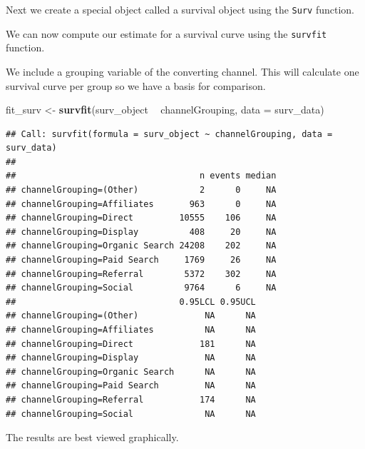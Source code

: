 \documentclass[]{book}
\newenvironment{Shaded}{\begin{snugshade}}{\end{snugshade}}
\newcommand{\KeywordTok}[1]{\textcolor[rgb]{0.13,0.29,0.53}{\textbf{#1}}}
\newcommand{\DataTypeTok}[1]{\textcolor[rgb]{0.13,0.29,0.53}{#1}}
\newcommand{\StringTok}[1]{\textcolor[rgb]{0.31,0.60,0.02}{#1}}
\newcommand{\OperatorTok}[1]{\textcolor[rgb]{0.81,0.36,0.00}{\textbf{#1}}}
\newcommand{\NormalTok}[1]{#1}
\begin{document}
Next we create a special object called a survival object using the
\texttt{Surv} function.

\begin{Shaded}
\end{Shaded}

We can now compute our estimate for a survival curve using the
\texttt{survfit} function.

We include a grouping variable of the converting channel. This will
calculate one survival curve per group so we have a basis for
comparison.

\begin{Shaded}
\begin{Highlighting}[]
\NormalTok{fit_surv <-}\StringTok{ }\KeywordTok{survfit}\NormalTok{(surv_object }\OperatorTok{~}\StringTok{ }\NormalTok{channelGrouping, }\DataTypeTok{data =}\NormalTok{ surv_data)}
\end{Highlighting}
\end{Shaded}

\begin{verbatim}
## Call: survfit(formula = surv_object ~ channelGrouping, data = surv_data)
## 
##                                    n events median
## channelGrouping=(Other)            2      0     NA
## channelGrouping=Affiliates       963      0     NA
## channelGrouping=Direct         10555    106     NA
## channelGrouping=Display          408     20     NA
## channelGrouping=Organic Search 24208    202     NA
## channelGrouping=Paid Search     1769     26     NA
## channelGrouping=Referral        5372    302     NA
## channelGrouping=Social          9764      6     NA
##                                0.95LCL 0.95UCL
## channelGrouping=(Other)             NA      NA
## channelGrouping=Affiliates          NA      NA
## channelGrouping=Direct             181      NA
## channelGrouping=Display             NA      NA
## channelGrouping=Organic Search      NA      NA
## channelGrouping=Paid Search         NA      NA
## channelGrouping=Referral           174      NA
## channelGrouping=Social              NA      NA
\end{verbatim}

The results are best viewed graphically.
\end{document}

